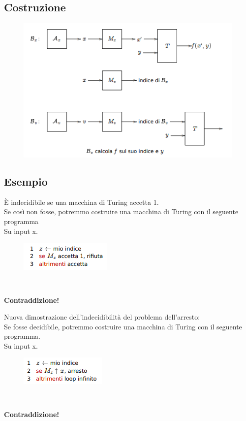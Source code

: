 \subsection{Costruzione}
\begin{figure}[htp]
    \centering
    \includegraphics[scale=1]{tesi_stile/img/cap6f4.png}
\end{figure}
\newpage
\subsection{Esempio}
È indecidibile se una macchina di Turing accetta 1.\\
Se così non fosse, potremmo costruire una macchina di Turing con il seguente programma\\
Su input x.\\
\begin{figure}[htp]
    \includegraphics[scale=0.8]{tesi_stile/img/cap6f5.png}
\end{figure}\\
\begin{center}
    \textbf{Contraddizione!}
\end{center}
Nuova dimostrazione dell’indecidibilità del problema dell’arresto:\\
Se fosse decidibile, potremmo costruire una macchina di Turing con il seguente programma.\\
Su input x.\\
\begin{figure}[htp]
    \includegraphics[scale=0.8]{tesi_stile/img/cap6f6.png}
\end{figure}\\
\begin{center}
    \textbf{Contraddizione!}
\end{center}
\newpage
